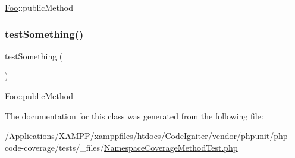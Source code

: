 \mbox{\hyperlink{class_foo}{Foo}}\+::public\+Method \mbox{\label{class_namespace_coverage_method_test_a0fc4e17369bc9607ebdd850d9eda8167}} 
\subsubsection{\texorpdfstring{test\+Something()}{testSomething()}\hspace{0.1cm}{\footnotesize\ttfamily [2/2]}}
{\footnotesize\ttfamily test\+Something (\begin{DoxyParamCaption}{ }\end{DoxyParamCaption})}

\mbox{\hyperlink{class_foo}{Foo}}\+::public\+Method 

The documentation for this class was generated from the following file\+:\begin{DoxyCompactItemize}
\item 
/\+Applications/\+X\+A\+M\+P\+P/xamppfiles/htdocs/\+Code\+Igniter/vendor/phpunit/php-\/code-\/coverage/tests/\+\_\+files/\mbox{\hyperlink{php-code-coverage_2tests_2__files_2_namespace_coverage_method_test_8php}{Namespace\+Coverage\+Method\+Test.\+php}}\end{DoxyCompactItemize}
